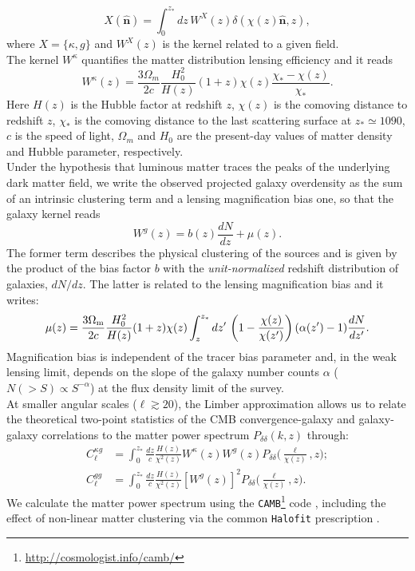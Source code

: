 \documentclass[a4paper,11pt]{article}
\newcommand{\nver}{\hat{\mathbf{n}}}
\begin{document}
\begin{equation}
X(\nver) = \int_0^{z_*} dz\, W^X(z)\delta(\chi(z)\nver,z),
\end{equation}
%
where $X=\{\kappa,g\}$ and $W^X(z)$ is the kernel related to a given field.\\
The kernel $W^{\kappa}$ quantifies the matter distribution lensing efficiency and it reads
%
\begin{equation}
W^{\kappa}(z) = \frac{3\Omega_m}{2c}\frac{H_0^2}{H(z)}(1+z)\chi(z)\frac{\chi_*-\chi(z)}{\chi_*}.
\end{equation}
%
Here $H(z)$ is the Hubble factor at redshift $z$, $\chi(z)$ is the comoving distance to redshift $z$, $\chi_*$ is the comoving distance to the last scattering surface at $z_*\simeq
1090$, $c$ is the speed of light, $\Omega_m$ and $H_0$ are the present-day values of matter
density and Hubble parameter, respectively.\\
Under the hypothesis that luminous matter traces the peaks of the underlying dark matter field, we write the observed projected galaxy overdensity as the sum of an intrinsic clustering term and a lensing magnification bias one, so that the galaxy kernel reads
%
\begin{equation}
W^{g}(z) = b(z)\frac{dN}{dz} + \mu(z).
\label{eqn:wg}
\end{equation}
%
The former term describes the physical clustering of the sources and is given by the product of the bias factor $b$ with the \emph{unit-normalized} redshift distribution of galaxies, $dN/dz$. The latter is related to the lensing magnification bias and it writes:
%
\begin{equation}
\label{eqn:wmu}
\mu(z) = \frac{3\Omega_{\rm m}}{2c}\frac{H_0^2}{H(z)}(1+z)\chi(z) \int_z^{z_*}dz'\,\left(1-\frac{\chi(z)}{\chi(z')}\right)(\alpha(z')-1)\frac{dN}{dz'}.
\end{equation}
%
Magnification bias is independent of the tracer bias parameter and, in the weak lensing limit, depends on the slope of the galaxy number counts $\alpha$ ($N(>S)\propto S^{-\alpha}$) at the flux density limit of the survey. \\
At smaller angular scales ($\ell \gtrsim 20$), the Limber approximation \cite{Limber1953} allows us to relate the theoretical two-point statistics of the CMB convergence-galaxy and galaxy-galaxy correlations to the matter power spectrum $P_{\delta\delta}(k,z)$ through:
%
\begin{equation}\label{eq:cross}
\begin{split}
C_{\ell}^{\kappa g} &=   \int_0^{z_*} \frac{dz}{c} \frac{H(z)}{\chi^2(z)} W^{\kappa}(z)W^{g}(z)P_{\delta\delta}\biggl(\frac{\ell}{\chi(z)},z\biggr); \\
C_{\ell}^{gg} &=   \int_0^{z_*} \frac{dz}{c} \frac{H(z)}{\chi^2(z)} [W^{g}(z)]^2P_{\delta\delta}\biggl(\frac{\ell}{\chi(z)},z\biggr).
\end{split}
\end{equation}
%
We calculate the matter power spectrum using the \texttt{CAMB}\footnote{\url{http://cosmologist.info/camb/}} code \cite{Lewis2000},
including the effect of non-linear matter clustering via the common \texttt{Halofit} prescription \citep{Takahashi2012}.
\end{document}
